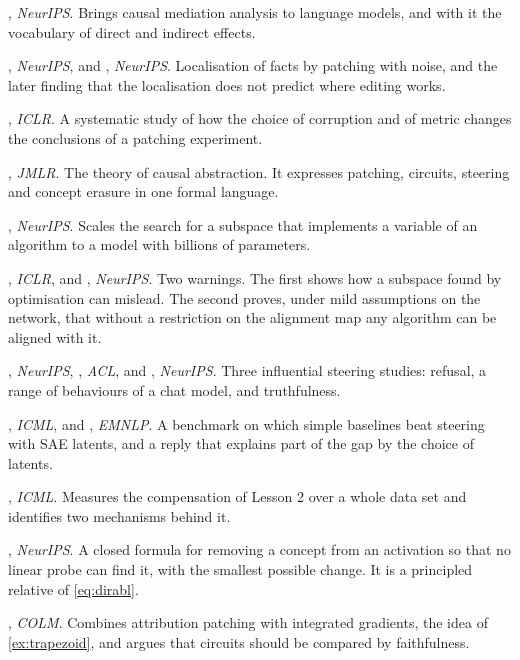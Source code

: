 \begin{readinglist}
\item \citet{vig2020investigating}, \emph{NeurIPS}. Brings causal mediation analysis to language models, and with it
the vocabulary of direct and indirect effects.
\item \citet{meng2022locating}, \emph{NeurIPS}, and \citet{hase2023does}, \emph{NeurIPS}. Localisation of facts by
patching with noise, and the later finding that the localisation does not predict where editing works.
\item \citet{zhang2024towards}, \emph{ICLR}. A systematic study of how the choice of corruption and of metric
changes the conclusions of a patching experiment.
\item \citet{geiger2025causal}, \emph{JMLR}. The theory of causal abstraction. It expresses patching, circuits,
steering and concept erasure in one formal language.
\item \citet{wu2023interpretability}, \emph{NeurIPS}. Scales the search for a subspace that implements a variable
of an algorithm to a model with billions of parameters.
\item \citet{makelov2024subspace}, \emph{ICLR}, and \citet{sutter2025nonlinear}, \emph{NeurIPS}. Two warnings. The
first shows how a subspace found by optimisation can mislead. The second proves, under mild assumptions on the
network, that without a restriction on the alignment map any algorithm can be aligned with it.
\item \citet{arditi2024refusal}, \emph{NeurIPS}, \citet{rimsky2024steering}, \emph{ACL}, and
\citet{li2023inference}, \emph{NeurIPS}. Three influential steering studies: refusal, a range of behaviours of a
chat model, and truthfulness.
\item \citet{wu2025axbench}, \emph{ICML}, and \citet{arad2025saes}, \emph{EMNLP}. A benchmark on which simple
baselines beat steering with SAE latents, and a reply that explains part of the gap by the choice of latents.
\item \citet{rushing2024explorations}, \emph{ICML}. Measures the compensation of Lesson 2 over a whole data set
and identifies two mechanisms behind it.
\item \citet{belrose2023leace}, \emph{NeurIPS}. A closed formula for removing a concept from an activation so that
no linear probe can find it, with the smallest possible change. It is a principled relative of \eqref{eq:dirabl}.
\item \citet{hanna2024faith}, \emph{COLM}. Combines attribution patching with integrated gradients, the idea of
\cref{ex:trapezoid}, and argues that circuits should be compared by faithfulness.
\end{readinglist}
